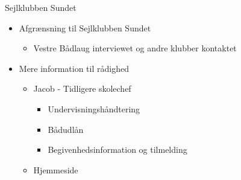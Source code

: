 \begin{frame}{Sejlklubben Sundet}

	\begin{itemize}
	\item Afgrænsning til Sejlklubben Sundet
			\begin{itemize}
			\item Vestre Bådlaug interviewet og andre klubber kontaktet
			\end{itemize}
	\item Mere information til rådighed
			\begin{itemize}
			\item Jacob - Tidligere skolechef
				\begin{itemize}
				\item Undervisningshåndtering
				\item Bådudlån
				\item Begivenhedsinformation og tilmelding
				\end{itemize}
			\item Hjemmeside
			\end{itemize}	
	\end{itemize}
	
\end{frame}